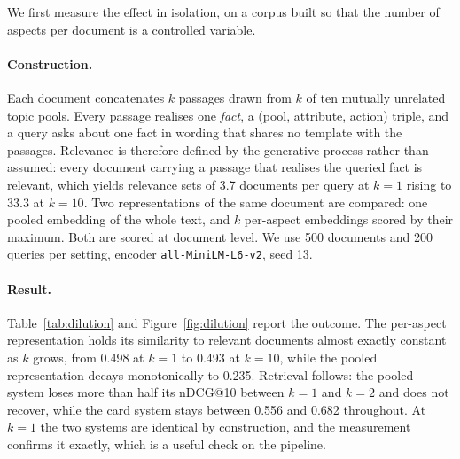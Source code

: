 We first measure the effect in isolation, on a corpus built so that the number of
aspects per document is a controlled variable.

\paragraph{Construction.}
Each document concatenates $k$ passages drawn from $k$ of ten mutually unrelated
topic pools. Every passage realises one \emph{fact}, a (pool, attribute, action)
triple, and a query asks about one fact in wording that shares no template with
the passages. Relevance is therefore defined by the generative process rather
than assumed: every document carrying a passage that realises the queried fact is
relevant, which yields relevance sets of 3.7 documents per query at $k=1$ rising
to 33.3 at $k=10$. Two representations of the same document are compared: one
pooled embedding of the whole text, and $k$ per-aspect embeddings scored by their
maximum. Both are scored at document level. We use 500 documents and 200 queries
per setting, encoder \texttt{all-MiniLM-L6-v2}, seed 13.

\paragraph{Result.}
Table~\ref{tab:dilution} and Figure~\ref{fig:dilution} report the outcome. The
per-aspect representation holds its similarity to relevant documents almost
exactly constant as $k$ grows, from 0.498 at $k=1$ to 0.493 at $k=10$, while the
pooled representation decays monotonically to 0.235. Retrieval follows: the
pooled system loses more than half its nDCG@10 between $k=1$ and $k=2$ and does
not recover, while the card system stays between 0.556 and 0.682 throughout. At
$k=1$ the two systems are identical by construction, and the measurement confirms
it exactly, which is a useful check on the pipeline.

